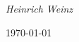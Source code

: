 \begin{titlepage}
	\hypersetup{pageanchor=false}
	\center
	\vspace{1.5cm}
	{\huge\bfseries \DocumentName \par}
	\vspace{2cm}
	{\Large\itshape Heinrich Weinz\par}
	\vspace{1cm}
	{\large\itshape \DocumentVersion\par}
	\vfill
	{\large \today\par}
\end{titlepage}